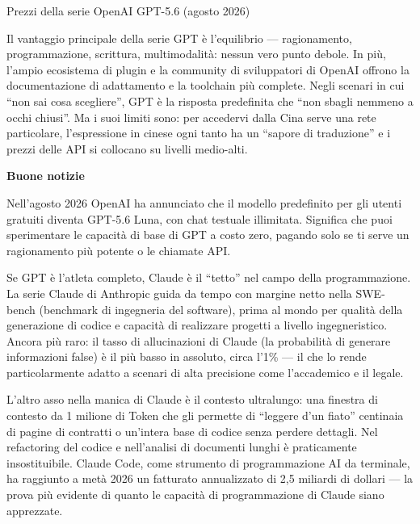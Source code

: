 \begin{center}\small\color{gray}Prezzi della serie OpenAI GPT-5.6 (agosto 2026)\end{center}

Il vantaggio principale della serie GPT è l'equilibrio — ragionamento, programmazione, scrittura, multimodalità: nessun vero punto debole. In più, l'ampio ecosistema di plugin e la community di sviluppatori di OpenAI offrono la documentazione di adattamento e la toolchain più complete. Negli scenari in cui “non sai cosa scegliere”, GPT è la risposta predefinita che “non sbagli nemmeno a occhi chiusi”. Ma i suoi limiti sono: per accedervi dalla Cina serve una rete particolare, l'espressione in cinese ogni tanto ha un “sapore di traduzione” e i prezzi delle API si collocano su livelli medio-alti.

\textbf{Buone notizie}\par

Nell'agosto 2026 OpenAI ha annunciato che il modello predefinito per gli utenti gratuiti diventa GPT-5.6 Luna, con chat testuale illimitata. Significa che puoi sperimentare le capacità di base di GPT a costo zero, pagando solo se ti serve un ragionamento più potente o le chiamate API.


Se GPT è l'atleta completo, Claude è il “tetto” nel campo della programmazione. La serie Claude di Anthropic guida da tempo con margine netto nella SWE-bench (benchmark di ingegneria del software), prima al mondo per qualità della generazione di codice e capacità di realizzare progetti a livello ingegneristico. Ancora più raro: il tasso di allucinazioni di Claude (la probabilità di generare informazioni false) è il più basso in assoluto, circa l'1\% — il che lo rende particolarmente adatto a scenari di alta precisione come l'accademico e il legale.

L'altro asso nella manica di Claude è il contesto ultralungo: una finestra di contesto da 1 milione di Token che gli permette di “leggere d'un fiato” centinaia di pagine di contratti o un'intera base di codice senza perdere dettagli. Nel refactoring del codice e nell'analisi di documenti lunghi è praticamente insostituibile. Claude Code, come strumento di programmazione AI da terminale, ha raggiunto a metà 2026 un fatturato annualizzato di 2,5 miliardi di dollari — la prova più evidente di quanto le capacità di programmazione di Claude siano apprezzate.

